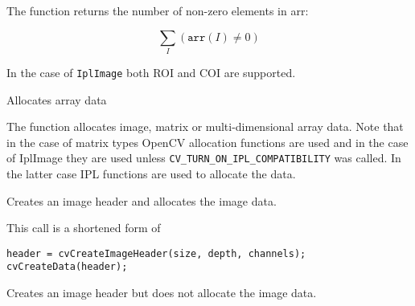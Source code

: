 
\begin{description}
\end{description}


The function returns the number of non-zero elements in arr:

\[ \sum_I (\texttt{arr}(I) \ne 0) \]

In the case of \texttt{IplImage} both ROI and COI are supported.


Allocates array data


\begin{description}
\end{description}


The function allocates image, matrix or
multi-dimensional array data. Note that in the case of matrix types OpenCV
allocation functions are used and in the case of IplImage they are used
unless \texttt{CV\_TURN\_ON\_IPL\_COMPATIBILITY} was called. In the
latter case IPL functions are used to allocate the data.

Creates an image header and allocates the image data.


\begin{description}
\end{description}

This call is a shortened form of
\begin{lstlisting}
header = cvCreateImageHeader(size, depth, channels);
cvCreateData(header);
\end{lstlisting}


Creates an image header but does not allocate the image data.



